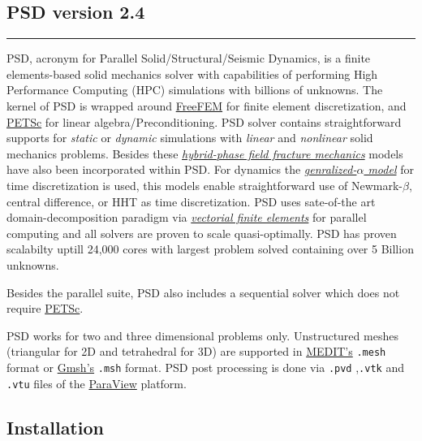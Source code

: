 \subsection{PSD version 2.4}

\begin{center}\rule{0.5\linewidth}{\linethickness}\end{center}

PSD, acronym for Parallel Solid/Structural/Seismic Dynamics, is a finite
elements-based solid mechanics solver with capabilities of performing
High Performance Computing (HPC) simulations with billions of unknowns.
The kernel of PSD is wrapped around \href{https://freefem.org/}{FreeFEM}
for finite element discretization, and
\href{https://www.mcs.anl.gov/petsc/}{PETSc} for linear
algebra/Preconditioning. PSD solver contains straightforward supports
for \emph{static} or \emph{dynamic} simulations with \emph{linear} and
\emph{nonlinear} solid mechanics problems. Besides these
\href{https://link.springer.com/article/10.1007/s00466-014-1109-y}{\emph{hybrid-phase
field fracture mechanics}} models have also been incorporated within
PSD. For dynamics the
\href{https://hal.archives-ouvertes.fr/hal-00345290/document}{\emph{genralized-\(\alpha\)
model}} for time discretization is used, this models enable
straightforward use of Newmark-\(\beta\), central difference, or HHT as
time discretization. PSD uses sate-of-the art domain-decomposition
paradigm via
\href{https://www.sciencedirect.com/science/article/pii/S0022407317309597}{\emph{vectorial
finite elements}} for parallel computing and all solvers are proven to
scale quasi-optimally. PSD has proven scalabilty uptill 24,000 cores
with largest problem solved containing over 5 Billion unknowns.

Besides the parallel suite, PSD also includes a sequential solver which
does not require \href{https://www.mcs.anl.gov/petsc/}{PETSc}.

PSD works for two and three dimensional problems only. Unstructured
meshes (triangular for 2D and tetrahedral for 3D) are supported in
\href{https://www.ljll.math.upmc.fr/frey/software.html}{MEDIT's}
\lstinline!.mesh! format or \href{http://gmsh.info/}{Gmsh's}
\lstinline!.msh! format. PSD post processing is done via
\lstinline!.pvd! ,\lstinline!.vtk! and \lstinline!.vtu! files of the
\href{https://www.paraview.org/}{ParaView} platform.

\subsection{Installation}

